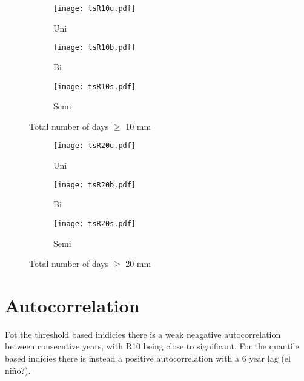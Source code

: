 \documentclass{article}
\begin{document}
		\begin{figure}[H]
		\centering
		\begin{subfigure}{0.3\textwidth}
			\centering
			\texttt{[image: tsR10u.pdf]}
			\caption{Uni}
		\end{subfigure}%
		\begin{subfigure}{0.3\textwidth}
			\centering
			\texttt{[image: tsR10b.pdf]}
			\caption{Bi}
		\end{subfigure}%
		\begin{subfigure}{0.3\textwidth}
			\centering
			\texttt{[image: tsR10s.pdf]}
			\caption{Semi}
		\end{subfigure}
		\caption{Total number of days $\geq$ 10 mm}
		\label{modesR10}
	\end{figure}

		\begin{figure}[H]
		\centering
		\begin{subfigure}{0.3\textwidth}
			\centering
			\texttt{[image: tsR20u.pdf]}
			\caption{Uni}
		\end{subfigure}%
		\begin{subfigure}{0.3\textwidth}
			\centering
			\texttt{[image: tsR20b.pdf]}
			\caption{Bi}
		\end{subfigure}%
		\begin{subfigure}{0.3\textwidth}
			\centering
			\texttt{[image: tsR20s.pdf]}
			\caption{Semi}
		\end{subfigure}
		\caption{Total number of days $\geq$ 20 mm}
		\label{modesR20}
	\end{figure}

	\section{Autocorrelation}
	Fot the threshold based inidicies there is a weak neagative autocorrelation between consecutive years, with R10 being close to significant. For the quantile based indicies there is instead a positive autocorrelation with a 6 year lag (el ni\~{n}o?). 
		
\end{document}

